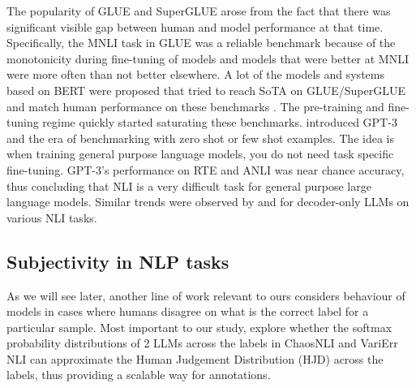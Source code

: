 The popularity of GLUE \citep{wang2019glue} and SuperGLUE \citep{wang2019superglue} arose from the fact that there was significant visible gap between human and model performance at that time.  
Specifically, the MNLI task in GLUE was a reliable benchmark because of the monotonicity during fine-tuning of models and models that were better at MNLI were more often than not better elsewhere. 
A lot of the models and systems based on BERT \citep{devlin2019bert} were proposed that tried to reach SoTA on GLUE/SuperGLUE and match human performance on these benchmarks \citep{he2021deberta,he2021debertav3,patra2022englishcentric}. 
The pre-training and fine-tuning regime quickly started saturating these benchmarks. 
\citet{brown2020language} introduced GPT-3 and the era of benchmarking with zero shot or few shot examples. 
The idea is when training general purpose language models, you do not need task specific fine-tuning. 
GPT-3's performance on RTE and ANLI was near chance accuracy, thus concluding that NLI is a very difficult task for general purpose large language models. 
Similar trends were observed by \citet{ohmer2024form} and \citet{weber-etal-2023-mind} for decoder-only LLMs on various NLI tasks. 


\subsection{Subjectivity in NLP tasks}
\label{related:subjectivity}
As we will see later, another line of work relevant to ours considers behaviour of models in cases where humans disagree on what is the correct label for a particular sample.
Most important to our study, \citet{chen2024seeingbig} explore whether the softmax probability distributions of 2 LLMs across the labels in ChaosNLI \citep{nie-etal-2020-learn} and VariErr NLI \citep{weber-genzel-etal-2024-varierr} can approximate the Human Judgement Distribution (HJD) across the labels, thus providing a scalable way for annotations.
